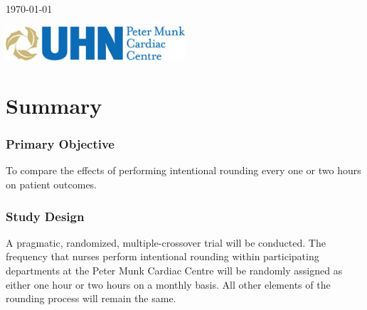 \documentclass[12pt]{article}
\begin{document}
\begin{titlepage}

\begin{center}
{\large \today}
\end{center}


\newcommand*{\plogo}{\includegraphics[width=0.5\textwidth]{image001.jpg}}

\plogo\\[1cm] %
 

\vfill %
\end{titlepage}

\newpage
\tableofcontents
\newpage

\section{Summary}
\subsubsection*{Primary Objective}
To compare the effects of performing intentional rounding every one or two hours on patient outcomes. 
\subsubsection*{Study Design}
A pragmatic, randomized, multiple-crossover trial will be conducted. The frequency that nurses perform intentional rounding within participating departments at the Peter Munk Cardiac Centre will be randomly assigned as either one hour or two hours on a monthly basis. All other elements of the rounding process will remain the same.
\end{document}
